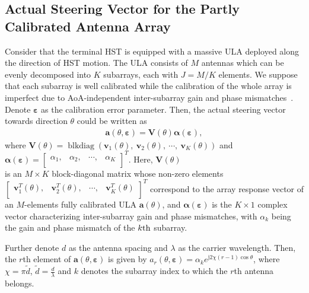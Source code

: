 \documentclass[12pt, draftclsnofoot, onecolumn]{IEEEtran}
\begin{document}
\vspace{-0.8em}
\subsection{Actual Steering Vector for the Partly Calibrated Antenna Array}
Consider that the terminal HST is equipped with a massive ULA deployed along the direction of HST motion. The ULA consists of $M$ antennas which can be evenly decomposed into $K$ subarrays, each with $J = M/K$ elements. We suppose that each subarray is well calibrated while the calibration of the whole array is imperfect due to AoA-independent inter-subarray gain and phase mismatches~\cite{CMS_See2004TSP}.
Denote $\boldsymbol{\varepsilon}$ as the calibration error parameter. Then, the actual steering vector towards direction $\theta$ could be written as~\cite{CMS_See2004TSP}
\begin{align}
\mathbf{a}(\theta, \boldsymbol \varepsilon)=\mathbf{V}(\theta)\boldsymbol \alpha(\boldsymbol \varepsilon),
\end{align}
where $\mathbf{V}(\theta) \!=\! \operatorname{blkdiag}\left({{\mathbf{v}}_{1}}(\theta), \!\ {{\mathbf{v}}_{2}}(\theta), \!\ \cdots\!, \!\ {{\mathbf{v}}_{K}}(\theta)\right) $ and $\boldsymbol{\alpha}(\boldsymbol{\varepsilon}) \!=\! {{\left[ \begin{matrix}
   {{\alpha}_{1}},\!\! & {{\alpha }_{2}},\!\! & \cdots\!,\!\!  & {{\alpha }_{K}}  \\
\end{matrix}\right]}^{T}}$. Here, $\mathbf{V}(\theta)$ \\ is an $M\times K$ block-diagonal matrix whose non-zero elements ${{\left[ \begin{matrix}
   \mathbf{v}_{1}^{T}(\theta), & \mathbf{v}_{2}^{T}(\theta), & \cdots\!,  & \mathbf{v}_{K}^{T}(\theta)  \\
\end{matrix}\right]}^{T}}$ correspond to the array response vector of an $M$-elements fully calibrated ULA $\mathbf{a}(\theta)$, and $\boldsymbol{\alpha}(\boldsymbol{\varepsilon})$ is the $K\times 1$ complex vector characterizing inter-subarray gain and phase mismatches, with $\alpha_k$ being the gain and phase mismatch of the $k\rm{th}$ subarray.

Further denote $d$ as the antenna spacing and $\lambda$ as the carrier wavelength. Then, the $r$th element of $\mathbf{a}(\theta, \boldsymbol \varepsilon)$ is given by ${{a}_{r}}\left( {{\theta }}, \boldsymbol{\varepsilon } \right) = {{\alpha }_{k}}{{e}^{\text{j}2\chi\left( r-1 \right)\cos {{\theta }}}}$, where $\chi = \pi \tilde{d} $, $\tilde{d} = \frac{d}{\lambda}$ and $k$ denotes the subarray index to which the $r$th antenna belongs.
\end{document}
